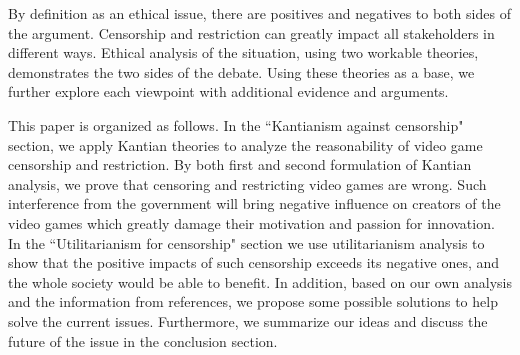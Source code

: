 By definition as an ethical issue, there are positives and negatives to both sides of the argument. Censorship and restriction can greatly impact all stakeholders in different ways. Ethical analysis of the situation, using two workable theories, demonstrates the two sides of the debate. Using these theories as a base, we further explore each viewpoint with additional evidence and arguments.

This paper is organized as follows. In the ``Kantianism against censorship" section, we apply Kantian theories to analyze the reasonability of video game censorship and restriction. By both first and second formulation of Kantian analysis, we prove that censoring and restricting video games are wrong. Such interference from the government will bring negative influence on creators of the video games which greatly damage their motivation and passion for innovation. In the ``Utilitarianism for censorship" section we use utilitarianism analysis to show that the positive impacts of such censorship exceeds its negative ones, and the whole society would be able to benefit. In addition, based on our own analysis and the information from references, we propose some possible solutions to help solve the current issues. Furthermore, we summarize our ideas and discuss the future of the issue in the conclusion section.